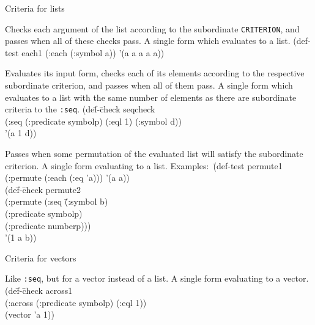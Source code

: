\begin{criteriaGroup}{Criteria for lists}{}

{Checks each argument of the list according to the subordinate
\texttt{CRITERION}, and passes when all of these checks pass.}
{A single form which evaluates to a list.}
{\noExpl}
{\singleEx}
{(def-test each1 (:each (:symbol a)) '(a a a a a))}

{Evaluates its input form, checks each of its elements according to
the respective subordinate criterion, and passes when all of them
pass.}
{A single form which evaluates to a list with the same number of
elements as there are subordinate criteria to the
\texttt{:seq}.}
{}
{\tabbingEx}{
(de\=f-\=check seqcheck
\\ \>\>  (:seq (:predicate symbolp) (:eql 1) (:symbol d))
\\ \>  '(a 1 d))
}

{Passes when some permutation of the evaluated list will satisfy the
subordinate criterion.}
{A single form evaluating to a list.}
{\noExpl}{\tabbingEx}{
\textrm{Examples:}\ \=(def-test permute1 (:permute (:each (:eq 'a))) '(a a))
\\ \> (de\=f-\=check permute2
\\ \> \> \> (:permute (:seq \=(:symbol b)
\\ \> \> \>             \>(:predicate symbolp)
\\ \> \> \>             \>(:predicate numberp)))
\\ \> \>'(1 a b))
}

\end{criteriaGroup}

\begin{criteriaGroup}{Criteria for vectors}{}

{Like \texttt{:seq}, but for a vector instead of a list.}
{A single form evaluating to a vector.}
{\noExpl}{\tabbingEx}{
(de\=f-\=check across1
\\ \>\>  (:across (:predicate symbolp) (:eql 1))
\\ \>  (vector 'a 1))}

\end{criteriaGroup}

